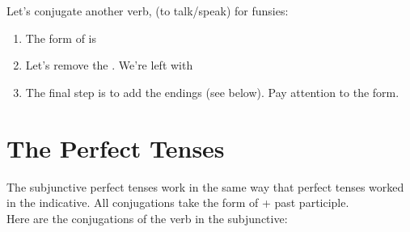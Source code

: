 


Let's conjugate another verb,  (to talk/speak) for funsies: 

\begin{enumerate}[noitemsep]
	\item The  form of  is 
	\item Let's remove the . We're left with 
	\item The final step is to add the endings (see below). Pay attention to the  form. 
\end{enumerate}

\section{The Perfect Tenses}

The subjunctive perfect tenses work in the same way that perfect tenses worked in the indicative. All conjugations take the form of  + past participle.\\ 

Here are the conjugations of the verb  in the subjunctive: 


